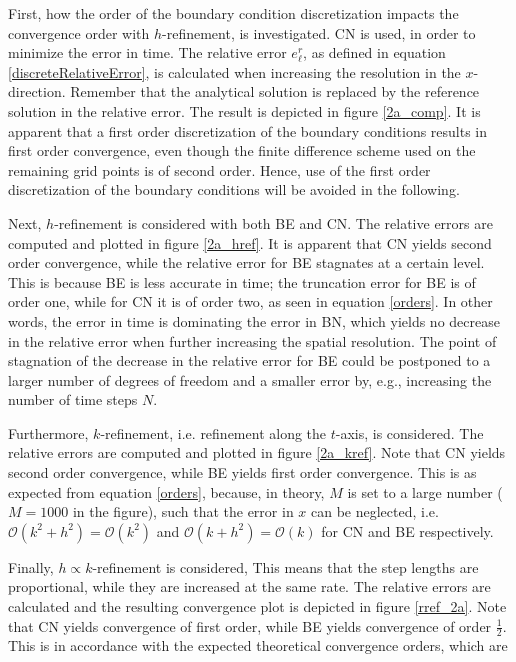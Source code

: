 First, how the order of the boundary condition discretization impacts the convergence order with $h$-refinement, is investigated. CN is used, in order to minimize the error in time. The relative error $e_{\ell}^r$, as defined in equation \eqref{discreteRelativeError}, is calculated when increasing the resolution in the $x$-direction. Remember that the analytical solution is replaced by the reference solution in the relative error. The result is depicted in figure \ref{2a_comp}. It is apparent that a first order discretization of the boundary conditions results in first order convergence, even though the finite difference scheme used on the remaining grid points is of second order. Hence, use of the first order discretization of the boundary conditions will be avoided in the following. 

Next, $h$-refinement is considered with both BE and CN. The relative errors are computed and plotted in figure \ref{2a_href}. It is apparent that CN yields second order convergence, while the relative error for BE stagnates at a certain level. This is because BE is less accurate in time; the truncation error for BE is of order one, while for CN it is of order two, as seen in equation \eqref{orders}. In other words, the error in time is dominating the error in BN, which yields no decrease in the relative error when further increasing the spatial resolution. The point of stagnation of the decrease in the relative error for BE could be postponed to a larger number of degrees of freedom and a smaller error by, e.g., increasing the number of time steps $N$.

Furthermore, $k$-refinement, i.e. refinement along the $t$-axis, is considered. The relative errors are computed and plotted in figure \ref{2a_kref}. Note that CN yields second order convergence, while BE yields first order convergence. This is as expected from equation \eqref{orders}, because, in theory, $M$ is set to a large number ($M = 1000$ in the figure), such that the error in $x$ can be neglected, i.e. $\mathcal{O}(k^2 + h^2) = \mathcal{O}(k^2)$ and $\mathcal{O}(k + h^2) = \mathcal{O}(k)$ for CN and BE respectively. 

Finally, $h \propto k$-refinement is considered, This means that the step lengths are proportional, while they are increased at the same rate. The relative errors are calculated and the resulting convergence plot is depicted in figure \ref{rref_2a}. Note that CN yields convergence of first order, while BE yields convergence of order $\frac{1}{2}$. This is in accordance with the expected theoretical convergence orders, which are


